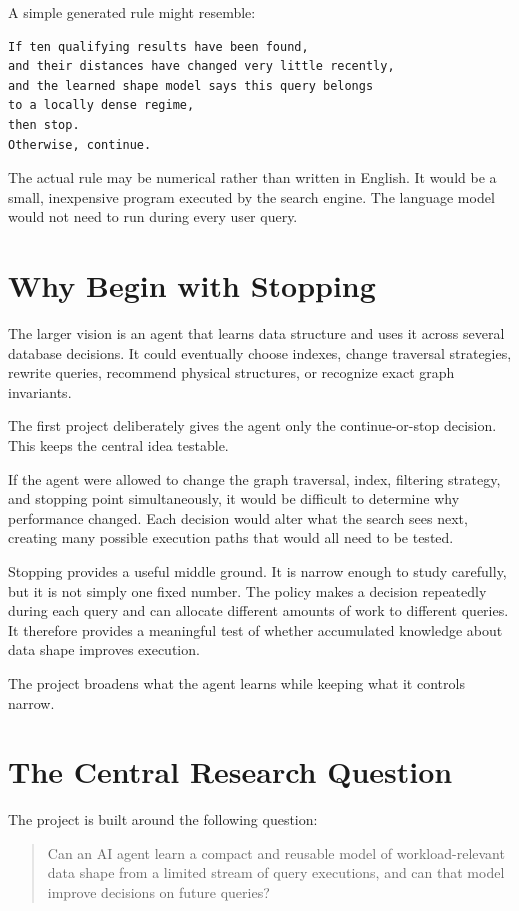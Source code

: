 \documentclass[11pt]{article}
\begin{document}
A simple generated rule might resemble:

\begin{verbatim}
If ten qualifying results have been found,
and their distances have changed very little recently,
and the learned shape model says this query belongs
to a locally dense regime,
then stop.
Otherwise, continue.
\end{verbatim}

The actual rule may be numerical rather than written in English. It would be a small, inexpensive program executed by the search engine. The language model would not need to run during every user query.

\section{Why Begin with Stopping}

The larger vision is an agent that learns data structure and uses it across several database decisions. It could eventually choose indexes, change traversal strategies, rewrite queries, recommend physical structures, or recognize exact graph invariants.

The first project deliberately gives the agent only the continue-or-stop decision. This keeps the central idea testable.

If the agent were allowed to change the graph traversal, index, filtering strategy, and stopping point simultaneously, it would be difficult to determine why performance changed. Each decision would alter what the search sees next, creating many possible execution paths that would all need to be tested.

Stopping provides a useful middle ground. It is narrow enough to study carefully, but it is not simply one fixed number. The policy makes a decision repeatedly during each query and can allocate different amounts of work to different queries. It therefore provides a meaningful test of whether accumulated knowledge about data shape improves execution.

The project broadens what the agent learns while keeping what it controls narrow.

\section{The Central Research Question}

The project is built around the following question:

\begin{quote}
Can an AI agent learn a compact and reusable model of workload-relevant data shape from a limited stream of query executions, and can that model improve decisions on future queries?
\end{quote}
\end{document}
